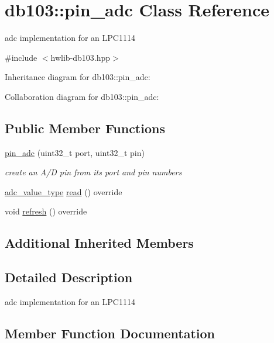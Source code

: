 \hypertarget{classdb103_1_1pin__adc}{}\section{db103\+:\+:pin\+\_\+adc Class Reference}
\label{classdb103_1_1pin__adc}


adc implementation for an L\+P\+C1114  




{\ttfamily \#include $<$hwlib-\/db103.\+hpp$>$}



Inheritance diagram for db103\+:\+:pin\+\_\+adc\+:


Collaboration diagram for db103\+:\+:pin\+\_\+adc\+:
\subsection*{Public Member Functions}
\begin{DoxyCompactItemize}
\item 
\mbox{\label{classdb103_1_1pin__adc_a8208afd669b42a5fd49cdaea3bd2fe86}} 
\hyperlink{classdb103_1_1pin__adc_a8208afd669b42a5fd49cdaea3bd2fe86}{pin\+\_\+adc} (uint32\+\_\+t port, uint32\+\_\+t pin)
\begin{DoxyCompactList}\small\item\em create an A/D pin from its port and pin numbers \end{DoxyCompactList}\item 
\hyperlink{classhwlib_1_1adc_a1faacac0cc2f78e90652b17250cbe159}{adc\+\_\+value\+\_\+type} \hyperlink{classdb103_1_1pin__adc_a2eca8e0a04be08ab585325d27ff93d64}{read} () override
\item 
void \hyperlink{classdb103_1_1pin__adc_aff62b5768df51a17f01d416002586e86}{refresh} () override
\end{DoxyCompactItemize}
\subsection*{Additional Inherited Members}


\subsection{Detailed Description}
adc implementation for an L\+P\+C1114 

\subsection{Member Function Documentation}
\mbox{\label{classdb103_1_1pin__adc_a2eca8e0a04be08ab585325d27ff93d64}} 
